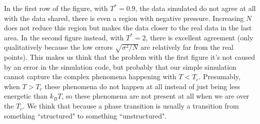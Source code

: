\documentclass[../main.tex]{subfiles}
\begin{document}
In the first row of the figure, with $T^*=0.9$, the data simulated do not agree at all with the data shared, there is even a region with negative pressure. Increasing $N$ does not reduce this region but makes the data closer to the real data in the last area. In the second figure instead, with $T^*=2$, there is excellent agreement (only qualitatively because the low errors $\sqrt{\sigma^2/N}$ are relatively far from the real points). This makes us think that the problem with the first figure it's not caused by an error in the simulation code, but probably that our simple simulation cannot capture the complex phenomena happening with $T <T_c$. Presumably, when $T>T_c$ these phenomena do not happen at all instead of just being less energetic than $k_BT$, so these phenomena are not present at all when we are over the $T_c$. We think that because a phase transition is usually a transition from something ``structured" to something ``unstructured".
\end{document}
